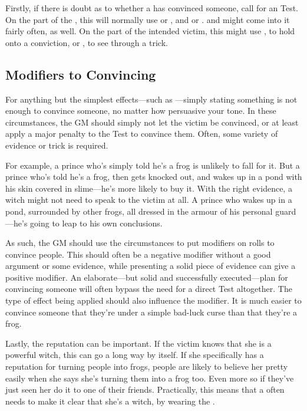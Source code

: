 Firstly, if there is doubt as to whether a  has convinced someone, call for an {\opposed} Test.
On the part of the , this will normally use  or , and  or .
 and  might come into it fairly often, as well.
On the part of the intended victim, this might use , to hold onto a conviction, or , to see through a trick.

\subsection{Modifiers to Convincing}

For anything but the simplest effects---such as ---simply stating something is not enough to convince someone, no matter how persuasive your tone.
In these circumstances, the GM should simply not let the victim be convinced, or at least apply a major penalty to the Test to convince them.
Often, some variety of evidence or trick is required.

For example, a prince who's simply told he's a frog is unlikely to fall for it.
But a prince who's told he's a frog, then gets knocked out, and wakes up in a pond with his skin covered in slime---he's more likely to buy it.
With the right evidence, a witch might not need to speak to the victim at all.
A prince who wakes up in a pond, surrounded by other frogs, all dressed in the armour of his personal guard---he's going to leap to his own conclusions.

As such, the GM should use the circumstances to put modifiers on rolls to convince people.
This should often be a negative modifier without a good argument or some evidence, while presenting a solid piece of evidence can give a positive modifier.
An elaborate---but solid and successfully executed---plan for convincing someone will often bypass the need for a direct Test altogether.
The type of effect being applied should also influence the modifier.
It is much easier to convince someone that they're under a simple bad-luck curse than that they're a frog.

Lastly, the  reputation can be important.
If the victim knows that she is a powerful witch, this can go a long way by itself.
If she specifically has a reputation for turning people into frogs, people are likely to believe her pretty easily when she says she's turning them into a frog too.
Even more so if they've just seen her do it to one of their friends.
Practically, this means that a  often needs to make it clear that she's a witch, by wearing the {\hat}.


